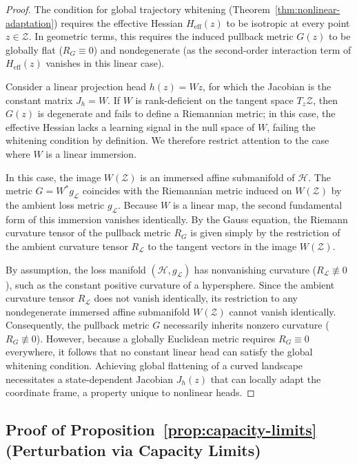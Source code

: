 \documentclass{article}
\theoremstyle{plain}
\theoremstyle{definition}
\theoremstyle{remark}
\begin{document}
\begin{proof}
The condition for global trajectory whitening (Theorem~\ref{thm:nonlinear-adaptation}) requires the effective Hessian $H_{\text{eff}}(z)$ to be isotropic at every point $z \in \mathcal{Z}$. In geometric terms, this requires the induced pullback metric $G(z)$ to be globally flat ($R_G \equiv 0$) and nondegenerate (as the second-order interaction term of $H_{\text{eff}}(z)$ vanishes in this linear case).

Consider a linear projection head $h(z) = Wz$, for which the Jacobian is the constant matrix $J_h = W$. If $W$ is rank-deficient on the tangent space $T_z \mathcal{Z}$, then $G(z)$ is degenerate and fails to define a Riemannian metric; in this case, the effective Hessian lacks a learning signal in the null space of $W$, failing the whitening condition by definition. We therefore restrict attention to the case where $W$ is a linear immersion.

In this case, the image $W(\mathcal{Z})$ is an immersed affine submanifold of $\mathcal{H}$. The metric $G = W^* g_{\mathcal{L}}$ coincides with the Riemannian metric induced on $W(\mathcal{Z})$ by the ambient loss metric $g_{\mathcal{L}}$. Because $W$ is a linear map, the second fundamental form of this immersion vanishes identically. By the Gauss equation, the Riemann curvature tensor of the pullback metric $R_G$ is given simply by the restriction of the ambient curvature tensor $R_{\mathcal{L}}$ to the tangent vectors in the image $W(\mathcal{Z})$.

By assumption, the loss manifold $(\mathcal{H}, g_{\mathcal{L}})$ has nonvanishing curvature ($R_{\mathcal{L}} \not\equiv 0$), such as the constant positive curvature of a hypersphere. Since the ambient curvature tensor $R_{\mathcal{L}}$ does not vanish identically, its restriction to any nondegenerate immersed affine submanifold $W(\mathcal{Z})$ cannot vanish identically. Consequently, the pullback metric $G$ necessarily inherits nonzero curvature ($R_G \not\equiv 0$). However, because a globally Euclidean metric requires $R_G \equiv 0$ everywhere, it follows that no constant linear head can satisfy the global whitening condition. Achieving global flattening of a curved landscape necessitates a state-dependent Jacobian $J_h(z)$ that can locally adapt the coordinate frame, a property unique to nonlinear heads.
\end{proof}

\subsection{Proof of Proposition~\ref{prop:capacity-limits} (Perturbation via Capacity Limits)}
\label{proof:prop-capacity}
\end{document}
